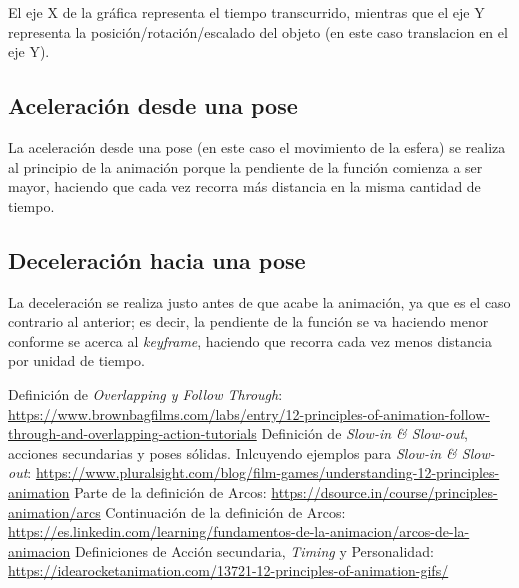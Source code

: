 \documentclass{article}
\begin{document}
El eje X de la gráfica representa el tiempo transcurrido, mientras que el eje Y representa la posición/rotación/escalado del objeto (en este caso translacion en el eje Y).

\subsection{Aceleración desde una pose}
La aceleración desde una pose (en este caso el movimiento de la esfera) se realiza al principio de la animación porque la pendiente de la función comienza a ser mayor, haciendo que cada vez recorra más distancia en la misma cantidad de tiempo.
\subsection{Deceleración hacia una pose}

La deceleración se realiza justo antes de que acabe la animación, ya que es el caso contrario al anterior; es decir, la pendiente de la función se va haciendo menor conforme se acerca al \textit{keyframe}, haciendo que recorra cada vez menos distancia por unidad de tiempo.


\begin{thebibliography}{1}
     Definición de \textit{Overlapping y Follow Through}: \url{https://www.brownbagfilms.com/labs/entry/12-principles-of-animation-follow-through-and-overlapping-action-tutorials} 
     Definición de \textit{Slow-in \& Slow-out}, acciones secundarias y poses sólidas. Inlcuyendo ejemplos para \textit{Slow-in \& Slow-out}: \url{https://www.pluralsight.com/blog/film-games/understanding-12-principles-animation}
     Parte de la definición de Arcos: \url{https://dsource.in/course/principles-animation/arcs}
     Continuación de la definición de Arcos: \url{https://es.linkedin.com/learning/fundamentos-de-la-animacion/arcos-de-la-animacion}
     Definiciones de Acción secundaria, \textit{Timing} y Personalidad: \url{https://idearocketanimation.com/13721-12-principles-of-animation-gifs/}
\end{thebibliography}
\end{document}
